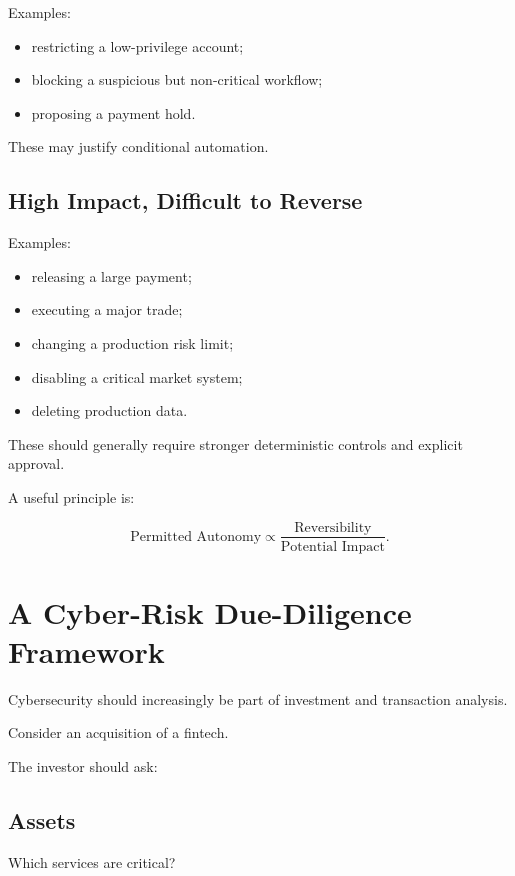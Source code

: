 Examples:

\begin{itemize}
    \item restricting a low-privilege account;
    \item blocking a suspicious but non-critical workflow;
    \item proposing a payment hold.
\end{itemize}

These may justify conditional automation.

\subsection{High Impact, Difficult to Reverse}

Examples:

\begin{itemize}
    \item releasing a large payment;
    \item executing a major trade;
    \item changing a production risk limit;
    \item disabling a critical market system;
    \item deleting production data.
\end{itemize}

These should generally require stronger deterministic controls and explicit approval.

A useful principle is:

\begin{equation}
\text{Permitted Autonomy}
\propto
\frac{\text{Reversibility}}{\text{Potential Impact}}.
\end{equation}

\section{A Cyber-Risk Due-Diligence Framework}

Cybersecurity should increasingly be part of investment and transaction analysis.

Consider an acquisition of a fintech.

The investor should ask:

\subsection{Assets}

Which services are critical?

